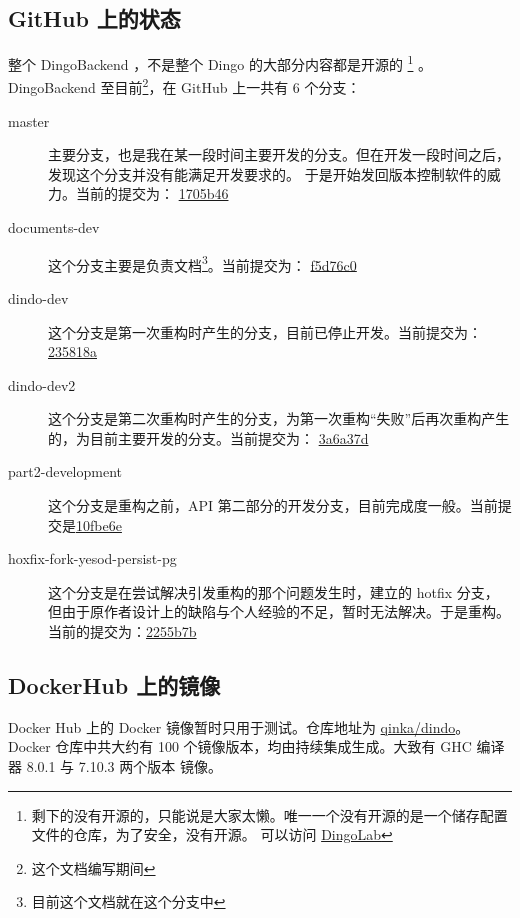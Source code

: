 \documentclass{dingo}
\begin{document}
  \subsection*{GitHub 上的状态}
    整个 DingoBackend ，不是整个 Dingo 的大部分内容都是开源的
      \footnote{剩下的没有开源的，只能说是大家太懒。唯一一个没有开源的是一个储存配置文件的仓库，为了安全，没有开源。
      可以访问 \href{https://github.com/DingoLab}{DingoLab}}
    。DingoBackend 至目前\footnote{这个文档编写期间}，在 GitHub 上一共有 6 个分支：
    \begin{description}
      \item[master] 主要分支，也是我在某一段时间主要开发的分支。但在开发一段时间之后，发现这个分支并没有能满足开发要求的。
        于是开始发回版本控制软件的威力。当前的提交为：
        \href{https://github.com/DingoLab/DingoBackend/commit/1705b461b8c2d9aa2245c2725006771ad8065995}{1705b46}
      \item[documents-dev] 这个分支主要是负责文档\footnote{目前这个文档就在这个分支中}。当前提交为：
        \href{https://github.com/DingoLab/DingoBackend/commit/f5d76c0fc408337203fc1fd54393ef41372ac4ea}{f5d76c0}
      \item[dindo-dev] 这个分支是第一次重构时产生的分支，目前已停止开发。当前提交为：
        \href{https://github.com/DingoLab/DingoBackend/commit/235818a90dff38b8276ce53233c0cdaaff7acdf0}{235818a}
      \item[dindo-dev2] 这个分支是第二次重构时产生的分支，为第一次重构“失败”后再次重构产生的，为目前主要开发的分支。当前提交为：
        \href{https://github.com/DingoLab/DingoBackend/commit/3a6a37d1183b270685cee25ad031e707e5e3b7fd}{3a6a37d}
      \item[part2-development] 这个分支是重构之前，API 第二部分的开发分支，目前完成度一般。当前提交是\href{https://github.com/DingoLab/DingoBackend/commit/10fbe6e39a8cc58e68b247423043d9b9e9012471}{10fbe6e}
      \item[hoxfix-fork-yesod-persist-pg] 这个分支是在尝试解决引发重构的那个问题发生时，建立的 hotfix 分支，但由于原作者设计上的缺陷与个人经验的不足，暂时无法解决。于是重构。
      当前的提交为：\href{https://github.com/DingoLab/DingoBackend/commit/2255b7be491450b555b5ac1f58bcb932e909bd1a}{2255b7b}
    \end{description}
    \subsection*{DockerHub 上的镜像}
      Docker Hub 上的 Docker 镜像暂时只用于测试。仓库地址为 \href{https://hub.docker.com/r/qinka/dindo/}{qinka/dindo}。
      Docker 仓库中共大约有 100 个镜像版本，均由持续集成生成。大致有 GHC 编译器 8.0.1 与 7.10.3 两个版本
      镜像。
\end{document}
